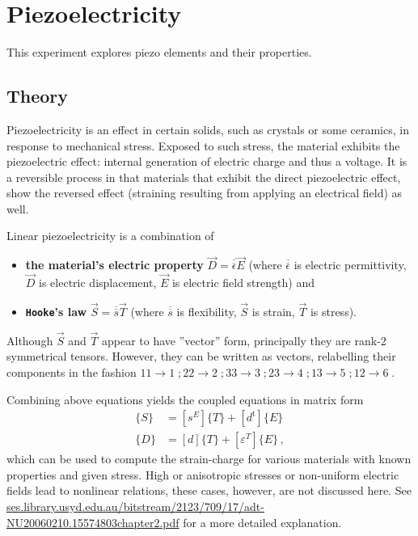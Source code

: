 \chapter{Piezoelectricity}
This experiment explores piezo elements and their properties.

\section{Theory}
Piezoelectricity is an effect in certain solids, such as crystals or some ceramics, in response to mechanical stress.
Exposed to such stress, the material exhibits the piezoelectric effect: internal generation of electric charge and thus a voltage.
It is a reversible process in that materials that exhibit the direct piezoelectric effect, show the reversed effect (straining resulting from applying an electrical field) as well.

Linear piezoelectricity is a combination of
\begin{itemize}
	\item \textbf{the material's electric property} $\vec{D}=\overline{\overline{\epsilon}}\vec{E}$ (where $\overline{\overline{\epsilon}}$ is electric permittivity, $\vec{D}$ is electric displacement, $\vec{E}$ is electric field strength) and
	\item \textbf{\texttt{Hooke}'s law} $\vec{S}=\overline{\overline{s}}\vec{T}$ (where $\overline{\overline{s}}$ is flexibility, $\vec{S}$ is strain, $\vec{T}$ is stress).
\end{itemize}
Although $\vec{S}$ and $\vec{T}$ appear to have ''vector'' form, principally they are rank-2 symmetrical tensors.
However, they can be written as vectors, relabelling their components in the fashion $11 \rightarrow 1 \;;  22 \rightarrow 2 \;;  33 \rightarrow 3 \;;  23 \rightarrow 4 \;;  13 \rightarrow 5 \; ;  12 \rightarrow 6 \;$.

Combining above equations yields the coupled equations in matrix form
\begin{align*}
	\{S\} &= \left [s^E \right ]\{T\}+[d^\mathrm{t}]\{E\} \\
	\{D\} &= [d]\{T\}+\left [ \varepsilon^T \right ] \{E\} \,,
\end{align*}
which can be used to compute the strain-charge for various materials with known properties and given stress.
High or anisotropic stresses or non-uniform electric fields lead to nonlinear relations, these cases, however, are not discussed here.
See \url{ses.library.usyd.edu.au/bitstream/2123/709/17/adt-NU20060210.15574803chapter2.pdf} for a more detailed explanation.
\clearpage
